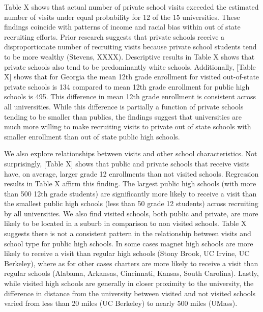 \documentclass[twoside]{article}
\begin{document}
Table X shows that actual number of private school visits exceeded the estimated number of visits under equal probability for 12 of the 15 universities. These findings coincide with patterns of income and racial bias within out of state recruiting efforts. Prior research suggests that private schools receive a disproportionate number of recruiting visits because private school students tend to be more wealthy (Stevens, XXXX). Descriptive results in Table X shows that private schools also tend to be predominantly white schools. Additionally, [Table X] shows that for Georgia the mean 12th grade enrollment for visited out-of-state private schools is 134 compared to mean 12th grade enrollment for public high schools is 495. This difference in mean 12th grade enrollment is consistent across all universities. While this difference is partially a function of private schools tending to be smaller than publics, the findings suggest that universities are much more willing to make recruiting visits to private out of state schools with smaller enrollment than out of state public high schools. 

We also explore relationships between visits and other school characteristics. Not surprisingly, [Table X] shows that public and private schools that receive visits have, on average, larger grade 12 enrollments than not visited schools. Regression results in Table X affirm this finding. The largest public high schools (with more than 500 12th grade students) are significantly more likely to receive a visit than the smallest public high schools (less than 50 grade 12 students) across recruiting by all universities.  We also find visited schools, both public and private, are more likely to be located in a suburb in comparison to non visited schools. Table X suggests there is not a consistent pattern in the relationship between visits and school type for public high schools. In some cases magnet high schools are more likely to receive a visit than regular high schools (Stony Brook, UC Irvine, UC Berkeley), where as for other cases charters are more likely to receive a visit than regular schools (Alabama, Arkansas, Cincinnati, Kansas, South Carolina). Lastly, while visited high schools are generally in closer proximity to the university, the difference in distance from the university between visited and not visited schools varied from less than 20 miles (UC Berkeley) to nearly 500 miles (UMass). 
\end{document}
